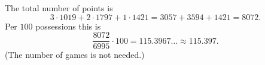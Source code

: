 The total number of points is
\[3\cdot1019+2\cdot1797+1\cdot1421=3057+3594+1421=8072.\]
Per $100$ possessions this is
\[\dfrac{8072}{6995}\cdot100=115.3967\ldots\approx\boxed{115.397}.\]
(The number of games is not needed.)
